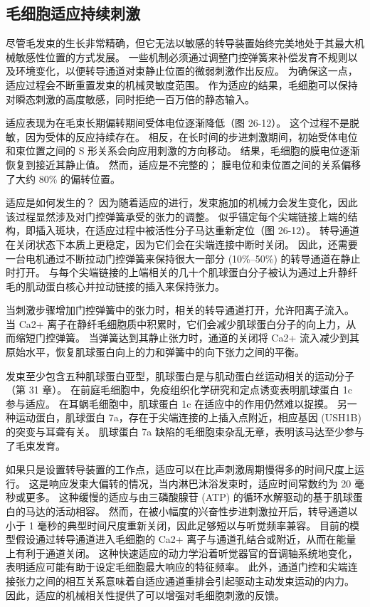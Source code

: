 \subsection{毛细胞适应持续刺激}
尽管毛发束的生长非常精确，但它无法以敏感的转导装置始终完美地处于其最大机械敏感性位置的方式发展。 一些机制必须通过调整门控弹簧来补偿发育不规则以及环境变化，以便转导通道对束静止位置的微弱刺激作出反应。 为确保这一点，适应过程会不断重置发束的机械灵敏度范围。 作为适应的结果，毛细胞可以保持对瞬态刺激的高度敏感，同时拒绝一百万倍的静态输入。

适应表现为在毛束长期偏转期间受体电位逐渐降低（图 26-12）。 这个过程不是脱敏，因为受体的反应持续存在。 相反，在长时间的步进刺激期间，初始受体电位和束位置之间的 S 形关系会向应用刺激的方向移动。 结果，毛细胞的膜电位逐渐恢复到接近其静止值。 然而，适应是不完整的； 膜电位和束位置之间的关系偏移了大约 80\% 的偏转位置。

适应是如何发生的？ 因为随着适应的进行，发束施加的机械力会发生变化，因此该过程显然涉及对门控弹簧承受的张力的调整。 似乎锚定每个尖端链接上端的结构，即插入斑块，在适应过程中被活性分子马达重新定位（图 26-12）。 转导通道在关闭状态下本质上更稳定，因为它们会在尖端连接中断时关闭。 因此，还需要一台电机通过不断拉动门控弹簧来保持很大一部分 (10\%–50\%) 的转导通道在静止时打开。 与每个尖端链接的上端相关的几十个肌球蛋白分子被认为通过上升静纤毛的肌动蛋白核心并拉动链接的插入来保持张力。

当刺激步骤增加门控弹簧中的张力时，相关的转导通道打开，允许阳离子流入。 当 Ca2+ 离子在静纤毛细胞质中积累时，它们会减少肌球蛋白分子的向上力，从而缩短门控弹簧。 当弹簧达到其静止张力时，通道的关闭将 Ca2+ 流入减少到其原始水平，恢复肌球蛋白向上的力和弹簧中的向下张力之间的平衡。

发束至少包含五种肌球蛋白亚型，肌球蛋白是与肌动蛋白丝运动相关的运动分子（第 31 章）。 在前庭毛细胞中，免疫组织化学研究和定点诱变表明肌球蛋白 1c 参与适应。 在耳蜗毛细胞中，肌球蛋白 1c 在适应中的作用仍然难以捉摸。 另一种运动蛋白，肌球蛋白 7a，存在于尖端连接的上插入点附近，相应基因 (USH1B) 的突变与耳聋有关。 肌球蛋白 7a 缺陷的毛细胞束杂乱无章，表明该马达至少参与了毛束发育。

如果只是设置转导装置的工作点，适应可以在比声刺激周期慢得多的时间尺度上运行。 这是响应发束大偏转的情况，当内淋巴沐浴发束时，适应时间常数约为 20 毫秒或更多。 这种缓慢的适应与由三磷酸腺苷 (ATP) 的循环水解驱动的基于肌球蛋白的马达的活动相容。 然而，在被小幅度的兴奋性步进刺激拉开后，转导通道以小于 1 毫秒的典型时间尺度重新关闭，因此足够短以与听觉频率兼容。 目前的模型假设通过转导通道进入毛细胞的 Ca2+ 离子与通道孔结合或附近，从而在能量上有利于通道关闭。 这种快速适应的动力学沿着听觉器官的音调轴系统地变化，表明适应可能有助于设定毛细胞最大响应的特征频率。 此外，通道门控和尖端连接张力之间的相互关系意味着自适应通道重排会引起驱动主动发束运动的内力。 因此，适应的机械相关性提供了可以增强对毛细胞刺激的反馈。

